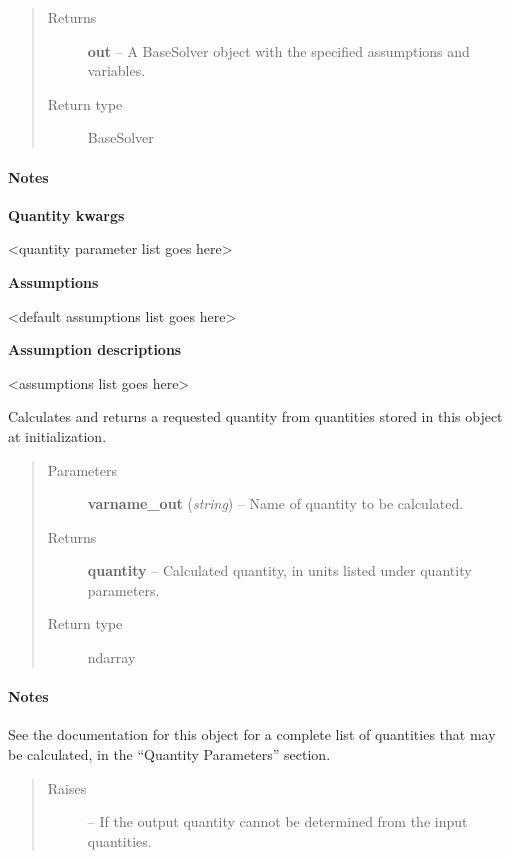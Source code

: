 \documentclass[letterpaper,10pt,english]{sphinxmanual}
\begin{document}
\begin{fulllineitems}
\begin{quote}
\begin{description}
\begin{itemize}
\end{itemize}

\item[{Returns}] \leavevmode
\textbf{out} --
A BaseSolver object with the specified assumptions and variables.

\item[{Return type}] \leavevmode
BaseSolver

\end{description}\end{quote}
\paragraph{Notes}

\textbf{Quantity kwargs}

\textless{}quantity parameter list goes here\textgreater{}

\textbf{Assumptions}

\textless{}default assumptions list goes here\textgreater{}

\textbf{Assumption descriptions}

\textless{}assumptions list goes here\textgreater{}

\begin{fulllineitems}
\label{atmos:atmos.solve.BaseSolver.calculate}
Calculates and returns a requested quantity from quantities stored in this
object at initialization.
\begin{quote}\begin{description}
\item[{Parameters}] \leavevmode
\textbf{varname\_out} (\emph{string}) -- Name of quantity to be calculated.

\item[{Returns}] \leavevmode
\textbf{quantity} --
Calculated quantity, in units listed under quantity parameters.

\item[{Return type}] \leavevmode
ndarray

\end{description}\end{quote}
\paragraph{Notes}

See the documentation for this object for a complete list of quantities
that may be calculated, in the ``Quantity Parameters'' section.
\begin{quote}\begin{description}
\item[{Raises}] \leavevmode
{} --
If the output quantity cannot be determined from the input
quantities.


\end{description}
\end{quote}
\end{fulllineitems}
\end{fulllineitems}
\end{document}
